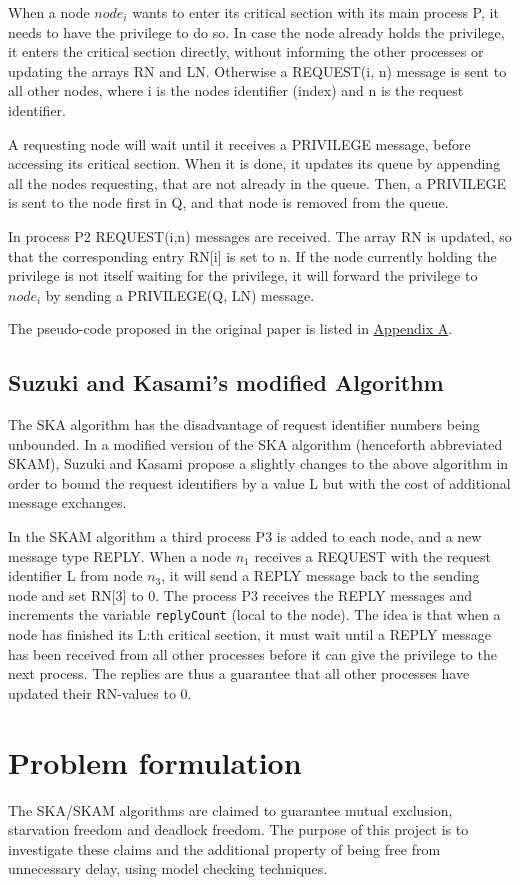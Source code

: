 \documentclass[a4paper,12pt]{article}
\begin{document}
When a node $node_i$ wants to enter its critical section with its main process P, it needs to have the privilege to do so. In case the node already holds the privilege, it enters the critical section directly, without informing the other processes or updating the arrays RN and LN. Otherwise a REQUEST(i, n) message is sent to all other nodes, where i is the nodes identifier (index) and n is the request identifier.

A requesting node will wait until it receives a PRIVILEGE message, before accessing its critical section. When it is done, it updates its queue by appending all the nodes requesting, that are not already in the queue. Then, a PRIVILEGE is sent to the node first in Q, and that node is removed from the queue.

In process P2 REQUEST(i,n) messages are received. The array RN is updated, so that the corresponding entry RN[i] is set to n. If the node currently holding the privilege is not itself waiting for the privilege, it will forward the privilege to $node_i$ by sending a PRIVILEGE(Q, LN) message.

The pseudo-code proposed in the original paper is listed in \hyperref[SKA]{Appendix A}.

\subsection{Suzuki and Kasami's modified Algorithm}
The SKA algorithm has the disadvantage of request identifier numbers being unbounded. In a modified version of the SKA algorithm (henceforth abbreviated SKAM), Suzuki and Kasami propose a slightly changes to the above algorithm in order to bound the request identifiers by a value L but with the cost of additional message exchanges.

In the SKAM algorithm a third process P3 is added to each node, and a new message type REPLY. When a node $n_1$ receives a REQUEST with the request identifier L from node $n_3$, it will send a REPLY message back to the sending node and set RN[3] to 0. The process P3 receives the REPLY messages and increments the variable \texttt{replyCount} (local to the node). The idea is that when a node has finished its L:th critical section, it must wait until a REPLY message has been received from all other processes before it can give the privilege to the next process. The replies are thus a guarantee that all other processes have updated their RN-values to 0.


\section{Problem formulation}
The SKA/SKAM algorithms are claimed to guarantee mutual exclusion, starvation freedom and deadlock freedom. The purpose of this project is to investigate these claims and the additional property of being free from unnecessary delay, using model checking techniques. 
\end{document}
